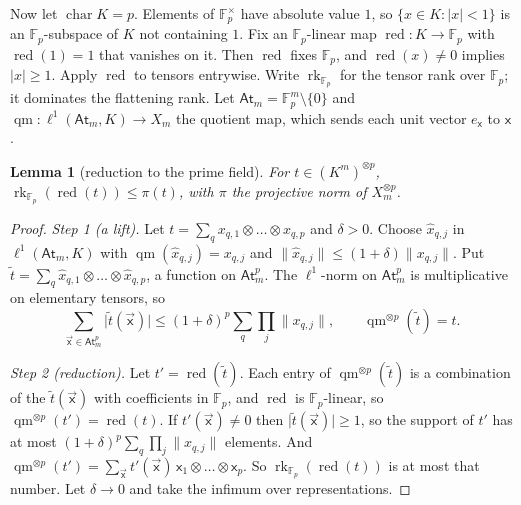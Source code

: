 \documentclass[11pt]{amsart}
\newtheorem{lemma}[theorem]{Lemma}
\theoremstyle{definition}
\theoremstyle{remark}
\numberwithin{equation}{section}
\newcommand{\F}{\mathbb F}
\newcommand{\abs}[1]{\lvert #1\rvert}
\newcommand{\norm}[1]{\lVert #1\rVert}
\theoremstyle{plain}
\theoremstyle{definition}
\theoremstyle{plain}
\begin{document}
Now let $\operatorname{char}K=p$. Elements of $\F_p^\times$ have absolute value $1$, so $\{x\in K:\abs x<1\}$ is an $\F_p$\nobreakdash-subspace of $K$ not containing $1$. Fix an $\F_p$\nobreakdash-linear map $\operatorname{red}\colon K\to\F_p$ with $\operatorname{red}(1)=1$ that vanishes on it. Then $\operatorname{red}$ fixes $\F_p$, and $\operatorname{red}(x)\ne0$ implies $\abs x\ge1$. Apply $\operatorname{red}$ to tensors entrywise. Write $\operatorname{rk}_{\F_p}$ for the tensor rank over $\F_p$; it dominates the flattening rank. Let $\mathsf{At}_m=\F_p^m\setminus\{0\}$ and $\operatorname{qm}\colon\ell^1(\mathsf{At}_m,K)\to X_m$ the quotient map, which sends each unit vector $e_{\mathsf x}$ to $\mathsf x$.

\begin{lemma}[reduction to the prime field]\label{amb:lem:reduction}
For $t\in(K^m)^{\otimes p}$, $\operatorname{rk}_{\F_p}(\operatorname{red}(t))\le\pi(t)$, with $\pi$ the projective norm of $X_m^{\otimes p}$.
\end{lemma}

\begin{proof}
\emph{Step 1 (a lift).} Let $t=\sum_qx_{q,1}\otimes\dots\otimes x_{q,p}$ and $\delta>0$. Choose $\hat x_{q,j}$ in $\ell^1(\mathsf{At}_m,K)$ with $\operatorname{qm}(\hat x_{q,j})=x_{q,j}$ and $\norm{\hat x_{q,j}}\le(1+\delta)\norm{x_{q,j}}$. Put $\tilde t=\sum_q\hat x_{q,1}\otimes\dots\otimes\hat x_{q,p}$, a function on $\mathsf{At}_m^p$. The $\ell^1$-norm on $\mathsf{At}_m^p$ is multiplicative on elementary tensors, so
\[
 \sum_{\vec{\mathsf x}\in\mathsf{At}_m^p}\abs{\tilde t(\vec{\mathsf x})}\le(1+\delta)^p\sum_q\prod_j\norm{x_{q,j}},\qquad\operatorname{qm}^{\otimes p}(\tilde t)=t.
\]

\emph{Step 2 (reduction).} Let $t'=\operatorname{red}(\tilde t)$. Each entry of $\operatorname{qm}^{\otimes p}(\tilde t)$ is a combination of the $\tilde t(\vec{\mathsf x})$ with coefficients in $\F_p$, and $\operatorname{red}$ is $\F_p$\nobreakdash-linear, so $\operatorname{qm}^{\otimes p}(t')=\operatorname{red}(t)$. If $t'(\vec{\mathsf x})\ne0$ then $\abs{\tilde t(\vec{\mathsf x})}\ge1$, so the support of $t'$ has at most $(1+\delta)^p\sum_q\prod_j\norm{x_{q,j}}$ elements. And $\operatorname{qm}^{\otimes p}(t')=\sum_{\vec{\mathsf x}}t'(\vec{\mathsf x})\,\mathsf x_1\otimes\dots\otimes\mathsf x_p$. So $\operatorname{rk}_{\F_p}(\operatorname{red}(t))$ is at most that number. Let $\delta\to0$ and take the infimum over representations.
\end{proof}
\end{document}
